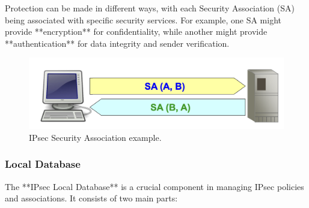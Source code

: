 \begin{tcolorbox}[colback=lightblue] 
    Protection can be made in different ways, with each Security Association (SA) being associated with specific security services. For example, one SA might provide **encryption** for confidentiality, while another might provide **authentication** for data integrity and sender verification. 
\end{tcolorbox}


\begin{figure}[H]
    \includegraphics[width=\linewidth]{Images/NetSec/SA.png}
    \caption{IPsec Security Association example.}
\end{figure}

\subsubsection{Local Database}

The **IPsec Local Database** is a crucial component in managing IPsec policies and associations. It consists of two main parts:

